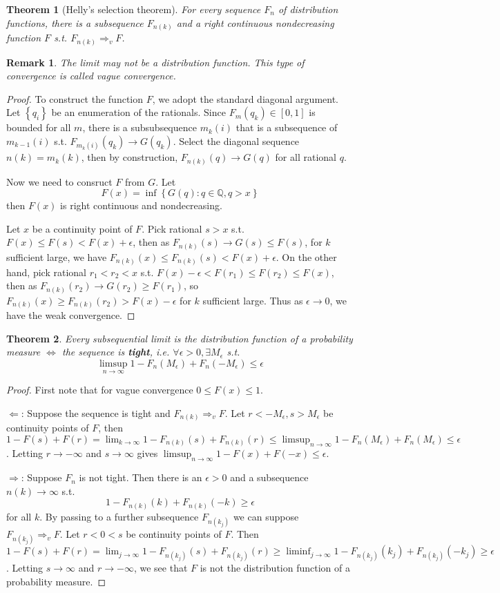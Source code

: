 \documentclass{article}
\newtheorem{Thm}{Theorem}[section]
\newtheorem*{Rk}{Remark}
\theoremstyle{definition}
\begin{document}
\begin{Thm}[Helly's selection theorem]
For every sequence $F_n$ of distribution functions, there is a subsequence $F_{n(k)}$ and a right continuous nondecreasing function $F$ s.t. $F_{n(k)}\Longrightarrow_v F$.
\end{Thm}
\begin{Rk}
The limit may not be a distribution function. This type of convergence is called vague convergence.
\end{Rk}
\begin{proof}
To construct the function $F$, we adopt the standard diagonal argument. Let $\left \{ q_i \right \} $ be an enumeration of the rationals. Since $F_m(q_k)\in [0,1]$ is bounded for all $m$, there is a subsubsequence $m_k(i)$ that is a subsequence of $m_{k-1}(i)$ s.t. $F_{m_k(i)}(q_k)\longrightarrow G(q_k)$. Select the diagonal sequence $n(k)=m_k(k)$, then by construction, $F_{n(k)}(q)\longrightarrow G(q)$ for all rational $q$.\par
Now we need to consruct $F$ from $G$. Let \[F(x)=\inf \left \{ G(q):q\in \mathbb{Q},q>x \right \} \]then $F(x)$ is right continuous and nondecreasing.\par
Let $x$ be a continuity point of $F$. Pick rational $s>x$ s.t. $F(x)\le F(s)< F(x)+\epsilon$, then as $F_{n(k)}(s)\longrightarrow G(s)\le F(s)$, for $k$ sufficient large, we have $F_{n(k)}(x)\le F_{n(k)}(s)<F(x)+\epsilon$. On the other hand, pick rational $r_1<r_2<x$ s.t. $F(x)-\epsilon<F(r_1)\le F(r_2)\le F(x)$, then as $F_{n(k)}(r_2)\longrightarrow G(r_2)\ge F(r_1)$, so $F_{n(k)}(x)\ge F_{n(k)}(r_2)>F(x)-\epsilon$ for $k$ sufficient large. Thus as $\epsilon\to 0$, we have the weak convergence.
\end{proof}
\begin{Thm}
Every subsequential limit is the distribution function of a probability measure $\Longleftrightarrow$ the sequence is \textbf{tight}, i.e. $\forall \epsilon>0,\exists M_\epsilon$ s.t.
\[\limsup_{n\to\infty} 1-F_n(M_\epsilon)+F_n(-M_\epsilon)\le \epsilon\]
\end{Thm}
\begin{proof}
First note that for vague convergence $0\le F(x)\le 1$.\par
$\Longleftarrow$: Suppose the sequence is tight and $F_{n(k)}\Longrightarrow_v F$. Let $r<-M_\epsilon,s>M_\epsilon$ be continuity points of $F$, then $1-F(s)+F(r)=\lim_{k\to\infty}1-F_{n(k)}(s)+F_{n(k)}(r)\le \limsup_{n\to\infty}1-F_n(M_\epsilon)+F_n(M_\epsilon)\le \epsilon$. Letting $r\to-\infty$ and $s\to\infty$ gives $\limsup_{n\to\infty}1-F(x)+F(-x)\le \epsilon$.\par
$\Longrightarrow$: Suppose $F_n$ is not tight. Then there is an $\epsilon>0$ and a subsequence $n(k)\to\infty$ s.t. \[1-F_{n(k)}(k)+F_{n(k)}(-k)\ge\epsilon\] for all $k$. By passing to a further subsequence $F_{n(k_j)}$ we can suppose $F_{n(k_j)}\Longrightarrow_v F$. Let $r<0<s$ be continuity points of $F$. Then $1-F(s)+F(r)=\lim_{j\to\infty} 1-F_{n(k_j)}(s)+F_{n(k_j)}(r)\ge\liminf_{j\to\infty}1-F_{n(k_j)}(k_j)+F_{n(k_j)}(-k_j)\ge\epsilon$. Letting $s\to\infty$ and $r\to-\infty$, we see that $F$ is not the distribution function of a probability measure.
\end{proof}
\end{document}
